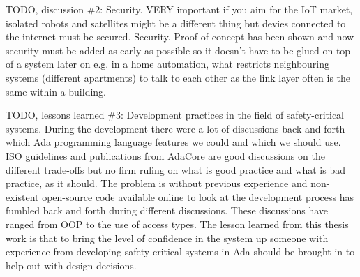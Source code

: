 TODO, discussion \#2: Security. VERY important if you aim for the IoT market,
isolated robots and satellites might be a different thing but devies connected
to the internet must be secured. Security. Proof of concept has been shown and
now security must be added as early as possible so it doesn't have to be glued
on top of a system later on e.g. in a home automation, what restricts
neighbouring systems (different apartments) to talk to each other as the link
layer often is the same within a building.

TODO, lessons learned \#3: Development practices in the field of
safety-critical systems. During the development there were a lot of discussions
back and forth which Ada programming language features we could and which we
should use. ISO guidelines and publications from AdaCore are good discussions
on the different trade-offs but no firm ruling on what is good practice and
what is bad practice, as it should. The problem is without previous experience
and non-existent open-source code available online to look at the development
process has fumbled back and forth during different discussions. These
discussions have ranged from OOP to the use of access types. The lesson learned
from this thesis work is that to bring the level of confidence in the system
up someone with experience from developing safety-critical systems in Ada
should be brought in to help out with design decisions.

%
% 
% 

